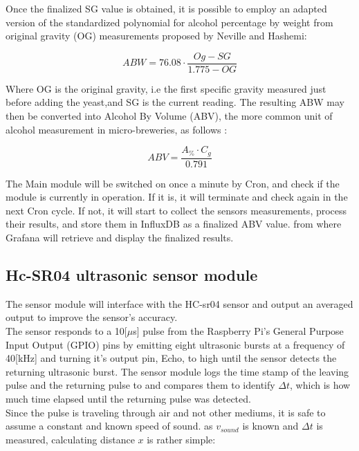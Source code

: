 \documentclass[twoside]{ctuthesis}
\theoremstyle{plain}
\theoremstyle{definition}
\theoremstyle{note}
\begin{document}
Once the finalized SG value is obtained, it is possible to employ an adapted version of the standardized polynomial for alcohol percentage by weight from original gravity (OG) measurements proposed by Neville and Hashemi\cite{PH_In_yeast}:

\begin{equation}
ABW = 76.08 \cdot \frac{Og - SG}{1.775-OG}
\end{equation} 

Where OG is the original gravity, i.e the first specific gravity measured just before adding the yeast,and SG is the current reading.
The resulting ABW may then be converted into Alcohol By Volume (ABV), the more common unit of alcohol measurement in micro-breweries, as follows \cite{Brewing_Science}:

\begin{equation}
	ABV = \frac{A_{\%} \cdot C_g}{0.791}
\end{equation}

The Main module will be switched on once a minute by Cron, and check if the module is currently in operation. If it is, it will terminate and check again in the next Cron cycle. If not, it will start to collect the sensors measurements, process their results, and store them in InfluxDB as a finalized ABV value. from where Grafana will retrieve and display the finalized results.

\subsection{Hc-SR04 ultrasonic sensor module}
The sensor module will interface with the HC-sr04 sensor and output an averaged output to improve the sensor's accuracy.\\
The sensor responds to a 10[$\mu$s] pulse from the Raspberry Pi's General Purpose Input Output (GPIO) pins by emitting eight ultrasonic bursts at a frequency of 40[kHz] and turning it's output pin, Echo, to high until the sensor detects the returning ultrasonic burst. The sensor module logs the time stamp of the leaving pulse and the returning pulse to and compares them to identify $\Delta t$, which is how much time elapsed until the returning pulse was detected.\\

Since the pulse is traveling through air and not other mediums, it is safe to assume a constant and known speed of sound. as $v_{sound}$ is known and $\Delta t$ is measured, calculating distance $x$ is rather simple:
\end{document}
